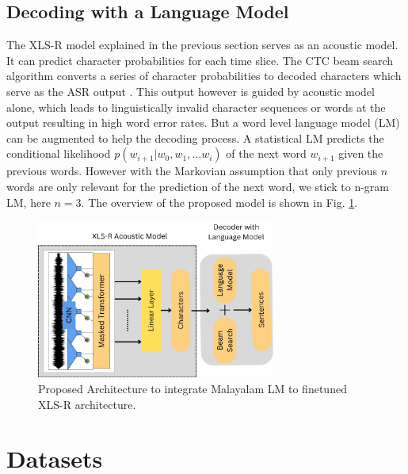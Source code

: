 \documentclass[runningheads]{llncs}
\begin{document}
\subsection{Decoding with a Language Model}

The XLS-R model explained in the previous section serves as an acoustic model. It can predict character probabilities for each time slice. The CTC beam search algorithm converts a series of character probabilities to decoded characters which serve as the ASR output \cite{graves2006connectionist}. This output however is guided by acoustic model alone, which leads to linguistically invalid character sequences or words at the output resulting in high word error rates. But a word level language model (LM) can be augmented to help the decoding process. A statistical LM predicts the conditional likelihood $p(w_{i+1}|w_0 , w_1 , ...w_i )$ of the next word $w_{i+1}$ given the previous words. However with the Markovian assumption that only previous $n$ words are only relevant for the prediction of the next word, we stick to n-gram LM, here $n=3$. The overview of the proposed model is shown in Fig. \ref{Fig:LM-model}.

\begin{figure}[htpb]
    
    \includegraphics[width=0.7\textwidth]{LM-decoder.png}
    \centering
    \caption{Proposed Architecture to integrate Malayalam LM to finetuned XLS-R architecture.} 
    \label{Fig:LM-model}
\end{figure}
\section{Datasets}

\label{sec:datasets}
\end{document}

